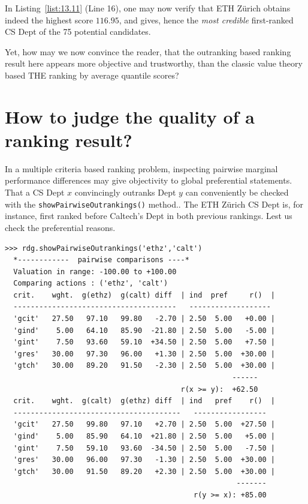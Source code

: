 In Listing~\vref{list:13.11} (Line 16), one may now verify that ETH Zürich obtains indeed the highest \NetFlows score $116.95$, and gives, hence the \emph{most credible} first-ranked CS Dept of the 75 potential candidates.

Yet, how may we now convince the reader, that the outranking based ranking result here appears more objective and trustworthy, than the classic value theory based THE ranking by average quantile scores?  

\section{How to judge the quality of a ranking result?}
\label{sec:13.3}

In a multiple criteria based ranking problem, inspecting pairwise marginal performance differences may give objectivity to global preferential statements. That a CS Dept $x$ convincingly outranks Dept $y$ can conveniently be checked with the \texttt{showPairwiseOutrankings()} method.. The ETH Zürich CS Dept is, for instance, first ranked before Caltech's Dept in both previous rankings. Lest us check the preferential reasons.
\begin{lstlisting}[caption={Comparing pairwise criteria performances},label=list:13.11,basicstyle=\ttfamily\scriptsize]
>>> rdg.showPairwiseOutrankings('ethz','calt')
  *------------  pairwise comparisons ----*
  Valuation in range: -100.00 to +100.00
  Comparing actions : ('ethz', 'calt')
  crit.    wght.  g(ethz)  g(calt) diff  | ind  pref     r()  | 
  --------------------------------------   -------------------
  'gcit'   27.50   97.10   99.80   -2.70 | 2.50  5.00   +0.00 | 
  'gind'    5.00   64.10   85.90  -21.80 | 2.50  5.00   -5.00 | 
  'gint'    7.50   93.60   59.10  +34.50 | 2.50  5.00   +7.50 | 
  'gres'   30.00   97.30   96.00   +1.30 | 2.50  5.00  +30.00 | 
  'gtch'   30.00   89.20   91.50   -2.30 | 2.50  5.00  +30.00 |
                                                     ------
                                         r(x >= y):  +62.50
  crit.    wght.  g(calt)  g(ethz) diff  | ind   pref    r()  |
  ---------------------------------------   -----------------
  'gcit'   27.50   99.80   97.10   +2.70 | 2.50  5.00  +27.50 | 
  'gind'    5.00   85.90   64.10  +21.80 | 2.50  5.00   +5.00 | 
  'gint'    7.50   59.10   93.60  -34.50 | 2.50  5.00   -7.50 | 
  'gres'   30.00   96.00   97.30   -1.30 | 2.50  5.00  +30.00 | 
  'gtch'   30.00   91.50   89.20   +2.30 | 2.50  5.00  +30.00 |
                                                      -------
                                            r(y >= x): +85.00
\end{lstlisting}

